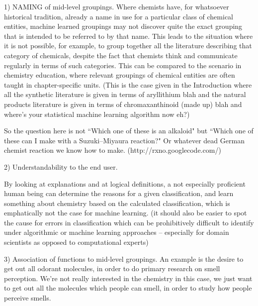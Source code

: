 \documentclass[10pt]{bmc_article}
\newenvironment{bmcformat}{\baselineskip20pt\sloppy\setboolean{publ}{false}}{\baselineskip20pt\sloppy}
\begin{document}
\begin{bmcformat}
1) NAMING of mid-level groupings. Where chemists have, for whatsoever historical tradition, already a name in use for a particular class of chemical entities, machine learned groupings may not discover quite the exact grouping that is intended to be referred to by that name. This leads to the situation where it is not possible, for example, to group together all the literature describing that category of chemicals, despite the fact that chemists think and communicate regularly in terms of such categories.  This can be compared to the scenario in chemistry education, where relevant groupings of chemical entities are often taught in chapter-specific units. (This is the case given in the Introduction where all the synthetic literature is given in terms of aryllithium blah and the natural products literature is given in terms of chromaxanthinoid (made up) blah and where's your statistical machine learning algorithm now eh?)

So the question here is not ``Which one of these is an alkaloid" but ``Which one of these can I make with a Suzuki--Miyaura reaction?" Or whatever dead German chemist reaction we know how to make.  (http://rxno.googlecode.com/)

2) Understandability to the end user. 

By looking at explanations and at logical definitions, a not especially proficient human being can determine the reasons for a given classification, and learn something about chemistry based on the calculated classification, which is emphatically not the case for machine learning. (it should also be easier to spot the cause for errors in classification which can be prohibitively difficult to identify under algorithmic or machine learning approaches -- especially for domain scientists as opposed to computational experts)


3) Association of functions to mid-level groupings.
An example is the desire to get out all odorant molecules, in order to do primary research on smell perception. 
We're not really interested in the chemistry in this case, we just want to get out all the molecules which people can smell, in order to study how people perceive smells. %


\end{bmcformat}
\end{document}
